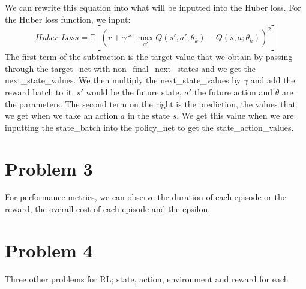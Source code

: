 \documentclass{article}
\numberwithin{equation}{section}
\numberwithin{equation}{section}
\def \E{\mathbb{E}}
\begin{document}
We can rewrite this equation into what will be inputted into the Huber loss.
For the Huber loss function, we input:
$$
Huber\_Loss = \E \left[ \left(r + \gamma *\ \max_{a'} Q(s',a'; \theta_k) - Q(s,a;\theta_k)\right)^2 \right]
$$
The first term of the subtraction is the target value that we obtain by passing through the target\_net with non\_final\_next\_states and we get the next\_state\_values. We then multiply the next\_state\_values by $\gamma$ and add the reward batch to it. $s'$ would be the future state, $a'$ the future action and $\theta$ are the parameters. The second term on the right is the prediction, the values that we get when we take an action $a$ in the state $s$. We get this value when we are inputting the state\_batch into the policy\_net to get the state\_action\_values. 










\section{Problem 3}
For performance metrics, we can observe the duration of each episode or the reward, the overall cost of each episode and the epsilon.







\section{Problem 4}
Three other problems for RL; state, action, environment and reward for each


\begin{comment}
\begin{figure}
	\centering
	\hspace*{-3.0cm}
	\texttt{[image: Q4.2M.png]}
	\\	
	\textbf{Fig.7:} Comparator for 3-bit signed integers, $a=-2=[1,1,0]$
	\\
	\label{fig:Fig.7}
\end{figure}
\end{comment}
\end{document}
